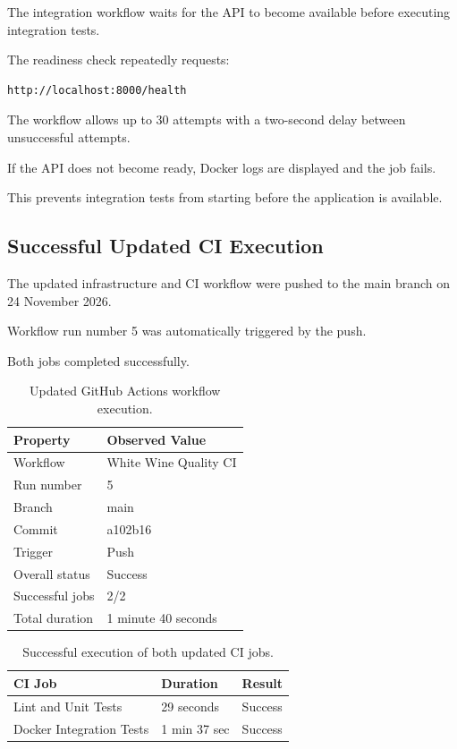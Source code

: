 \documentclass[11pt,a4paper]{article}
\begin{document}
The integration workflow waits for the API to
become available before executing integration tests.

The readiness check repeatedly requests:

\begin{lstlisting}
http://localhost:8000/health
\end{lstlisting}

The workflow allows up to 30 attempts with a
two-second delay between unsuccessful attempts.

If the API does not become ready, Docker logs
are displayed and the job fails.

This prevents integration tests from starting
before the application is available.

\subsection{Successful Updated CI Execution}

The updated infrastructure and CI workflow were
pushed to the main branch on 24 November 2026.

Workflow run number 5 was automatically triggered
by the push.

Both jobs completed successfully.

\begin{table}[H]
\centering
\begin{tabularx}{\linewidth}{@{}lX@{}}
\toprule
\textbf{Property} & \textbf{Observed Value}\\
\midrule
Workflow & White Wine Quality CI\\
Run number & 5\\
Branch & main\\
Commit & a102b16\\
Trigger & Push\\
Overall status & Success\\
Successful jobs & 2/2\\
Total duration & 1 minute 40 seconds\\
\bottomrule
\end{tabularx}
\caption{Updated GitHub Actions workflow execution.}
\end{table}

\begin{table}[H]
\centering
\begin{tabularx}{\linewidth}{@{}Xll@{}}
\toprule
\textbf{CI Job} & \textbf{Duration} & \textbf{Result}\\
\midrule
Lint and Unit Tests & 29 seconds & Success\\
Docker Integration Tests & 1 min 37 sec & Success\\
\bottomrule
\end{tabularx}
\caption{Successful execution of both updated CI jobs.}
\end{table}
\end{document}
